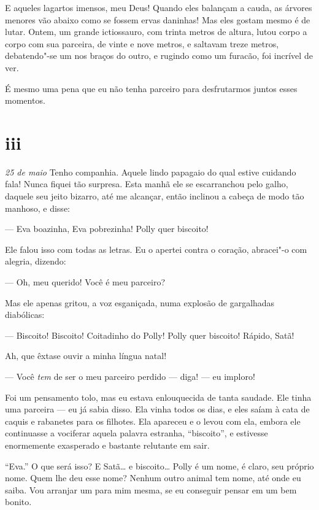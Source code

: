 E aqueles lagartos imensos, meu Deus! Quando eles balançam a cauda, as árvores menores vão abaixo como se fossem ervas daninhas!
Mas eles gostam mesmo é de lutar. Ontem, um grande ictiossauro, com trinta metros de altura, lutou corpo a corpo com sua parceira,
de vinte e nove metros, e saltavam treze metros, debatendo"-se um nos braços do outro, e rugindo como um furacão, foi incrível de ver.

É mesmo uma pena que eu não tenha parceiro para desfrutarmos juntos esses momentos.

\section{iii}

\textit{25 de maio} Tenho companhia. Aquele lindo papagaio do qual estive cuidando fala! Nunca fiquei tão surpresa. Esta manhã
ele se escarranchou pelo galho, daquele seu jeito bizarro, até me alcançar, então inclinou a cabeça de modo tão manhoso,
e disse:

--- Eva boazinha, Eva pobrezinha! Polly quer biscoito!     

Ele falou isso com todas as letras. Eu o apertei contra o coração, abracei"-o com alegria, dizendo:

--- Oh, meu querido! Você é meu parceiro?

Mas ele apenas gritou, a voz esganiçada, numa explosão de gargalhadas diabólicas:

--- Biscoito! Biscoito! Coitadinho do Polly! Polly quer biscoito! Rápido, Satã!

Ah, que êxtase ouvir a minha língua natal!

--- Você \textit{tem} de ser o meu parceiro perdido --- diga! --- eu imploro!

Foi um pensamento tolo, mas eu estava enlouquecida de tanta saudade. Ele tinha uma parceira ---
eu já sabia disso. Ela vinha todos os dias, e eles saíam à cata de caquis e rabanetes para os filhotes. Ela apareceu e
o levou com ela, embora ele continuasse a vociferar aquela palavra estranha, ``biscoito'', e estivesse enormemente exasperado e
bastante relutante em sair.

``Eva.'' O que será isso? E Satã\ldots{} e biscoito\ldots{} Polly é um nome, é claro, seu próprio nome. Quem lhe deu esse nome? Nenhum outro animal
tem nome, até onde eu saiba. Vou arranjar um para mim mesma, se eu conseguir pensar em um bem bonito.

